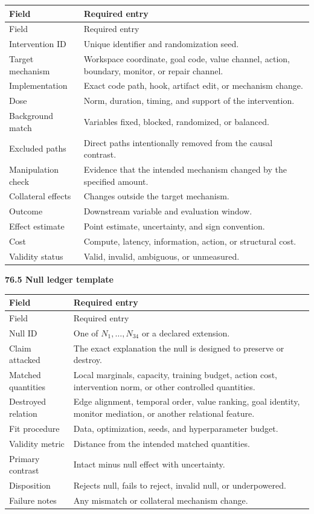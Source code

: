\documentclass[11pt,letterpaper]{article}
\newcommand{\subtopic}[1]{%
 \vspace{0.45em}
 {\bfseries\color{AccentColor} #1\par}
}
\theoremstyle{plain}
\theoremstyle{definition}
\begin{document}
\begin{longtable}{@{}p{}p{}@{}}
\toprule
Field & Required entry \\
\midrule
\endfirsthead
\toprule
Field & Required entry \\
\midrule
\endhead
Intervention ID & Unique identifier and randomization seed. \\
Target mechanism & Workspace coordinate, goal code, value channel, action,
boundary, monitor, or repair channel. \\
Implementation & Exact code path, hook, artifact edit, or mechanism change. \\
Dose & Norm, duration, timing, and support of the intervention. \\
Background match & Variables fixed, blocked, randomized, or balanced. \\
Excluded paths & Direct paths intentionally removed from the causal contrast. \\
Manipulation check & Evidence that the intended mechanism changed by the
specified amount. \\
Collateral effects & Changes outside the target mechanism. \\
Outcome & Downstream variable and evaluation window. \\
Effect estimate & Point estimate, uncertainty, and sign convention. \\
Cost & Compute, latency, information, action, or structural cost. \\
Validity status & Valid, invalid, ambiguous, or unmeasured. \\
\bottomrule
\end{longtable}

\subtopic{76.5 Null ledger template}

\begin{longtable}{@{}p{}p{}@{}}
\toprule
Field & Required entry \\
\midrule
\endfirsthead
\toprule
Field & Required entry \\
\midrule
\endhead
Null ID & One of \(N_1,\ldots,N_{34}\) or a declared extension. \\
Claim attacked & The exact explanation the null is designed to preserve or
destroy. \\
Matched quantities & Local marginals, capacity, training budget, action cost,
intervention norm, or other controlled quantities. \\
Destroyed relation & Edge alignment, temporal order, value ranking, goal
identity, monitor mediation, or another relational feature. \\
Fit procedure & Data, optimization, seeds, and hyperparameter budget. \\
Validity metric & Distance from the intended matched quantities. \\
Primary contrast & Intact minus null effect with uncertainty. \\
Disposition & Rejects null, fails to reject, invalid null, or underpowered. \\
Failure notes & Any mismatch or collateral mechanism change. \\
\bottomrule
\end{longtable}
\end{document}
